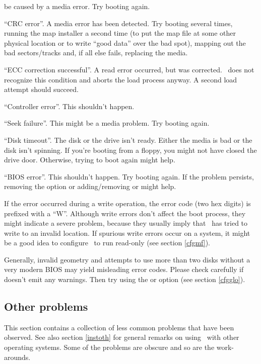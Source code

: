 \begin{description}
    be caused by a media error. Try booting again.
  \item[\raw{0x10}] ``CRC error''. A media error has been detected. Try
    booting several times,
    running the map installer a second time (to put the map file at some
    other physical location or to write ``good data'' over
    the bad spot), mapping out the bad sectors/tracks and, if all else
    fails, replacing the media.
  \item[\raw{0x11}] ``ECC correction successful''. A read error occurred,
    but was corrected. \LILO\ does not recognize this condition and
    aborts the load process anyway. A second load attempt should
    succeed.
  \item[\raw{0x20}] ``Controller error''. This shouldn't happen.
  \item[\raw{0x40}] ``Seek failure''. This might be a media problem. Try
    booting again.
  \item[\raw{0x80}] ``Disk timeout''. The disk or the drive isn't ready.
    Either the media is bad or the disk isn't spinning. If you're booting
    from a floppy, you might not have closed the drive door. Otherwise,
    trying to boot again might help.
  \item[\raw{0xBB}] ``BIOS error''. This shouldn't happen. Try booting
    again. If the problem persists, removing the  option or
    adding/removing  or  might help.
\end{description}

If the error occurred during a write operation, the error code (two hex
digits) is prefixed with a ``W''. Although write errors don't affect the
boot process, they might indicate a severe problem, because they usually
imply that \LILO\ has tried to write to an invalid location.
If spurious write errors occur on a system, it might be a good idea
to configure \LILO\ to run read-only (see section \ref{cfgmf}).

Generally, invalid geometry and attempts to use more than two disks without a
very modern BIOS may yield misleading error codes. Please check carefully
if  doesn't emit any warnings. Then try using the
 or  option (see section \ref{cfgglo}).


\subsection{Other problems}
\label{othpro}

This section contains a collection of less common problems that have been
observed. See also section \ref{instoth} for general remarks on using
\LILO\ with other operating systems. Some of the problems are obscure and
so are the work-arounds.

